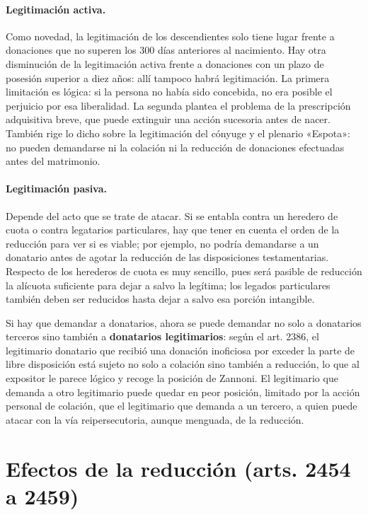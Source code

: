 \documentclass[12pt,oneside]{book}
\begin{document}
\paragraph{Legitimación activa.} Como novedad, la legitimación de los descendientes solo tiene lugar frente a donaciones que no superen los 300 días anteriores al nacimiento. Hay otra disminución de la legitimación activa frente a donaciones con un plazo de posesión superior a diez años: allí tampoco habrá legitimación. La primera limitación es lógica: si la persona no había sido concebida, no era posible el perjuicio por esa liberalidad. La segunda plantea el problema de la prescripción adquisitiva breve, que puede extinguir una acción sucesoria antes de nacer. También rige lo dicho sobre la legitimación del cónyuge y el plenario «Espota»: no pueden demandarse ni la colación ni la reducción de donaciones efectuadas antes del matrimonio.

\paragraph{Legitimación pasiva.} Depende del acto que se trate de atacar. Si se entabla contra un heredero de cuota o contra legatarios particulares, hay que tener en cuenta el orden de la reducción para ver si es viable; por ejemplo, no podría demandarse a un donatario antes de agotar la reducción de las disposiciones testamentarias. Respecto de los herederos de cuota es muy sencillo, pues será pasible de reducción la alícuota suficiente para dejar a salvo la legítima; los legados particulares también deben ser reducidos hasta dejar a salvo esa porción intangible.

Si hay que demandar a donatarios, ahora se puede demandar no solo a donatarios terceros sino también a \textbf{donatarios legitimarios}: según el art. 2386, el legitimario donatario que recibió una donación inoficiosa por exceder la parte de libre disposición está sujeto no solo a colación sino también a reducción, lo que al expositor le parece lógico y recoge la posición de Zannoni. El legitimario que demanda a otro legitimario puede quedar en peor posición, limitado por la acción personal de colación, que el legitimario que demanda a un tercero, a quien puede atacar con la vía reipersecutoria, aunque menguada, de la reducción.

\section{Efectos de la reducción (arts. 2454 a 2459)}
\end{document}
